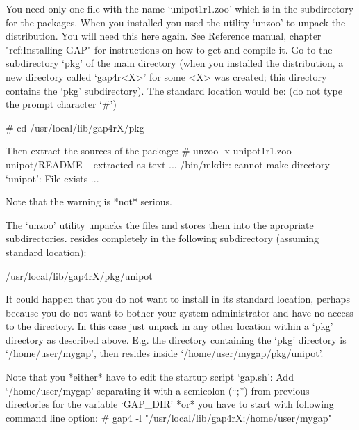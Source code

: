 You  need  only one  file with the name `unipot1r1.zoo'  which  is in the
subdirectory for the packages.  When  you  installed  {\GAP} you used the
utility  `unzoo'  to unpack the  distribution.  You  will  need this here
again.  See  {\GAP}  Reference manual, chapter "ref:Installing  GAP"  for
instructions on how to  get and compile it.  Go to the subdirectory `pkg'
of the main {\GAP} directory (when you installed the {\GAP} distribution,
a new  directory  called  `gap4r<X>'  for  some  <X>  was  created;  this
directory contains the `pkg'  subdirectory). The standard  location would
be: (do not type the prompt character `\#')

\begintt
# cd /usr/local/lib/gap4rX/pkg
\endtt

Then extract the sources of the {\Unipot} package:
\begintt
# unzoo -x unipot1r1.zoo
unipot/README     -- extracted as text
...
/bin/mkdir: cannot make directory `unipot': File exists
...
\endtt

Note that the warning is *not* serious.

The `unzoo' utility unpacks the files and stores them into the apropriate
subdirectories. {\Unipot} resides completely in the following subdirectory
(assuming standard location):

\begintt
/usr/local/lib/gap4rX/pkg/unipot
\endtt



It could happen that you do not want to install {\Unipot} in its standard
location,  perhaps  because  you  do  not  want  to  bother  your  system
administrator and have  no access to the {\GAP} directory.  In  this case
just unpack  {\Unipot} in any other location within a `pkg'  directory as
described  above. E.g.  the directory containing  the  `pkg' directory is
`/home/user/mygap',       then       {\Unipot}       resides       inside
`/home/user/mygap/pkg/unipot'.

Note that you *either* have to edit the startup script `gap.sh':
\beginlist%
   Add `/home/user/mygap' separating it with a semicolon (``;'')
   from previous directories for the variable `GAP_DIR'
\endlist
*or* you have to start {\GAP} with following command line option:
\begintt
# gap4 -l "/usr/local/lib/gap4rX;/home/user/mygap"
\endtt



